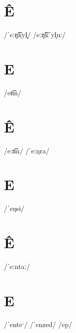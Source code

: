 \documentclass[10pt,a4paper,twoside]{book}
\begin{document}
\section*{Ê}

\begin{multicols}{3}
 {/ˈeːŋ͡kyl̥/} {}
 {/eːŋ͡kˈyl̥uː/} {}
\end{multicols}

\section*{E}

\begin{multicols}{3}
 {/en͡n/} {}
\end{multicols}

\section*{Ê}

\begin{multicols}{3}
 {/eːn͡n/} {}
 {/ˈeːŋra/} {}
\end{multicols}

\section*{E}

\begin{multicols}{3}
 {/ˈeŋsi/} {}
\end{multicols}

\section*{Ê}

\begin{multicols}{3}
 {/ˈeːntaː/} {}
\end{multicols}

\section*{E}

\begin{multicols}{3}
 {/ˈenteˑ/} {}
 {/ˈenzed/} {}
 {/ep/} {}
\end{multicols}
\end{document}
